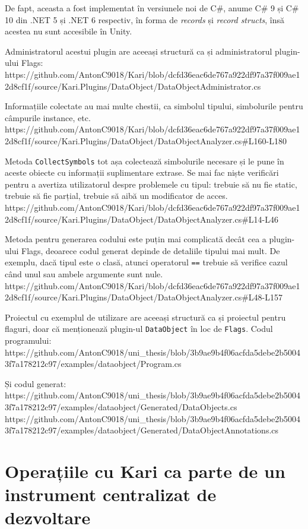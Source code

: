 \documentclass[a4paper,12pt]{report}
\begin{document}
De fapt, aceasta a fost implementat în versiunele noi de C\#, anume C\# 9 și C\# 10 din {{.}NET} 5 și {{.}NET} 6 respectiv, în forma de \emph{records} și \emph{record structs}, însă acestea nu sunt accesibile în Unity.\cite{records_in_csharp}

Administratorul acestui plugin are aceeași structură ca și administratorul plugin-ului Flags:
https://github.com/AntonC9018/Kari/blob/dcfd36eac6de767a922df97a37f009ae12d8cf1f/source/Kari.Plugins/DataObject/DataObjectAdministrator.cs

Informațiile colectate au mai multe chestii, ca simbolul tipului, simbolurile pentru câmpurile instance, etc.
https://github.com/AntonC9018/Kari/blob/dcfd36eac6de767a922df97a37f009ae12d8cf1f/source/Kari.Plugins/DataObject/DataObjectAnalyzer.cs#L160-L180

Metoda \texttt{CollectSymbols} tot așa colectează simbolurile necesare și le pune în aceste obiecte cu informații suplimentare extrase.
Se mai fac niște verificări pentru a avertiza utilizatorul despre problemele cu tipul: trebuie să nu fie static, trebuie să fie parțial, trebuie să aibă un modificator de acces.
https://github.com/AntonC9018/Kari/blob/dcfd36eac6de767a922df97a37f009ae12d8cf1f/source/Kari.Plugins/DataObject/DataObjectAnalyzer.cs#L14-L46

Metoda pentru generarea codului este puțin mai complicată decât cea a plugin-ului Flags, deoarece codul generat depinde de detaliile tipului mai mult.
De exemplu, dacă tipul este o clasă, atunci operatorul \texttt{==} trebuie să verifice cazul când unul sau ambele argumente sunt nule. 
https://github.com/AntonC9018/Kari/blob/dcfd36eac6de767a922df97a37f009ae12d8cf1f/source/Kari.Plugins/DataObject/DataObjectAnalyzer.cs#L48-L157

Proiectul cu exemplul de utilizare are aceeași structură ca și proiectul pentru flaguri, doar că menționează plugin-ul \texttt{DataObject} în loc de \texttt{Flags}.
Codul programului:
https://github.com/AntonC9018/uni_thesis/blob/3b9ae9b4f06acfda5debe2b50043f7a178212c97/examples/dataobject/Program.cs

Și codul generat:
https://github.com/AntonC9018/uni_thesis/blob/3b9ae9b4f06acfda5debe2b50043f7a178212c97/examples/dataobject/Generated/DataObjects.cs
https://github.com/AntonC9018/uni_thesis/blob/3b9ae9b4f06acfda5debe2b50043f7a178212c97/examples/dataobject/Generated/DataObjectAnnotations.cs

\section{Operațiile cu Kari ca parte de un instrument centralizat de dezvoltare}
\end{document}

